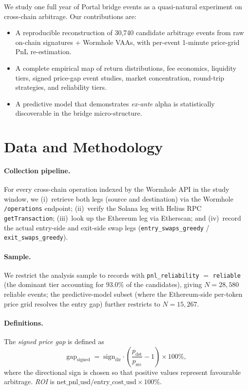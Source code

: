 \documentclass[11pt,a4paper]{article}
\begin{document}
We study one full year of Portal bridge events as a quasi-natural experiment
on cross-chain arbitrage. Our contributions are:
\begin{itemize}
    \item A reproducible reconstruction of 30{,}740 candidate arbitrage events
        from raw on-chain signatures + Wormhole VAAs, with per-event 1-minute
        price-grid PnL re-estimation.
    \item A complete empirical map of return distributions, fee economics,
        liquidity tiers, signed price-gap event studies, market concentration,
        round-trip strategies, and reliability tiers.
    \item A predictive model that demonstrates \textit{ex-ante} alpha is
        statistically discoverable in the bridge micro-structure.
\end{itemize}

\section{Data and Methodology}\label{sec:data}

\paragraph{Collection pipeline.} For every cross-chain operation indexed by
the Wormhole API in the study window, we (i)~retrieve both legs (source and
destination) via the Wormhole \texttt{/operations} endpoint; (ii)~verify the
Solana leg with Helius RPC \texttt{getTransaction}; (iii)~look up the
Ethereum leg via Etherscan; and (iv)~record the actual entry-side and
exit-side swap legs (\texttt{entry\_swaps\_greedy} /
\texttt{exit\_swaps\_greedy}).

\paragraph{Sample.} We restrict the analysis sample to records with
\texttt{pnl\_reliability} $=$ \texttt{reliable} (the dominant tier accounting
for 93.0\% of the candidates), giving $N=28{,}580$ reliable events; the
predictive-model subset (where the Ethereum-side per-token price grid resolves
the entry gap) further restricts to $N=15{,}267$.

\paragraph{Definitions.} The \emph{signed price gap} is defined as
\begin{equation}
\text{gap}_{\text{signed}}\;=\;\mathrm{sign}_{\text{dir}}\cdot
    \left(\frac{p_{\text{dst}}}{p_{\text{src}}}-1\right)\times 100\%,
\end{equation}
where the directional sign is chosen so that positive values represent
favourable arbitrage. \emph{ROI} is
$\text{net\_pnl\_usd}/\text{entry\_cost\_usd}\times 100\%$.
\end{document}
